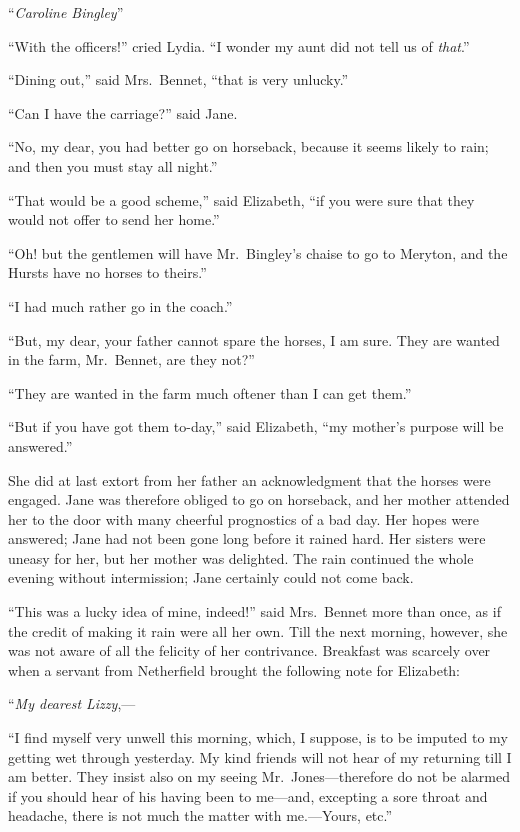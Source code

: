 \medskip
``\emph{Caroline Bingley}''
\bigskip

``With the officers!'' cried Lydia.  ``I wonder my aunt did not tell
us of \emph{that}.''

``Dining out,'' said Mrs.\ Bennet, ``that is very unlucky.''

``Can I have the carriage?'' said Jane.

``No, my dear, you had better go on horseback, because it seems
likely to rain; and then you must stay all night.''

``That would be a good scheme,'' said Elizabeth, ``if you were
sure that they would not offer to send her home.''

``Oh! but the gentlemen will have Mr.\ Bingley's chaise to go to
Meryton, and the Hursts have no horses to theirs.''

``I had much rather go in the coach.''

``But, my dear, your father cannot spare the horses, I am sure.
They are wanted in the farm, Mr.\ Bennet, are they not?''

``They are wanted in the farm much oftener than I can get them.''

``But if you have got them to-day,'' said Elizabeth, ``my mother's
purpose will be answered.''

She did at last extort from her father an acknowledgment that
the horses were engaged.  Jane was therefore obliged to go on
horseback, and her mother attended her to the door with many
cheerful prognostics of a bad day.  Her hopes were answered;
Jane had not been gone long before it rained hard.  Her sisters
were uneasy for her, but her mother was delighted.  The rain
continued the whole evening without intermission; Jane certainly
could not come back.

``This was a lucky idea of mine, indeed!'' said Mrs.\ Bennet more
than once, as if the credit of making it rain were all her own.  Till
the next morning, however, she was not aware of all the felicity
of her contrivance.  Breakfast was scarcely over when a servant
from Netherfield brought the following note for Elizabeth:

\bigskip
``\emph{My dearest Lizzy},---
\medskip

``I find myself very unwell this morning, which, I suppose, is to
be imputed to my getting wet through yesterday.  My kind friends
will not hear of my returning till I am better.  They insist also
on my seeing Mr.\ Jones---therefore do not be alarmed if you should
hear of his having been to me---and, excepting a sore throat and
headache, there is not much the matter with me.---Yours, etc.''
\bigskip

